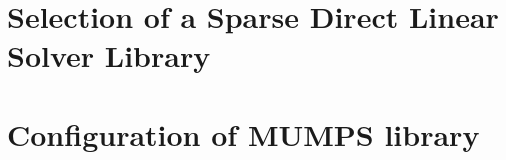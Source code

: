 \chapter{Selection of a Sparse Direct Linear Solver Library} \label{chapter:solver-selection}




\chapter{Configuration of MUMPS library} \label{chapter:solver-configuration}






















%
